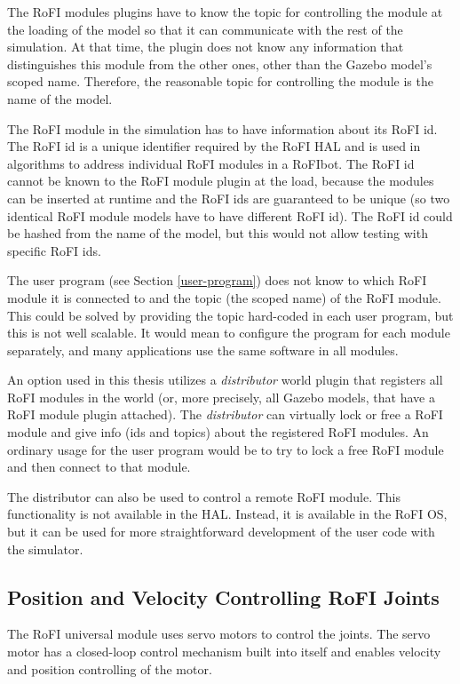 \documentclass[
  printed, %
  color,   %
  notable, %
  oneside, %
  nolof,   %
  nolot,   %
  nocover,
]{fithesis3}
\begin{document}
The RoFI modules plugins have to know the topic for controlling the module at the loading of the model so that it can communicate with the rest of the simulation.
At that time, the plugin does not know any information that distinguishes this module from the other ones, other than the Gazebo model's scoped name.
Therefore, the reasonable topic for controlling the module is the name of the model.

The RoFI module in the simulation has to have information about its RoFI id.
The RoFI id is a unique identifier required by the RoFI HAL and is used in algorithms to address individual RoFI modules in a RoFIbot.
The RoFI id cannot be known to the RoFI module plugin at the load, because the modules can be inserted at runtime and the RoFI ids are guaranteed to be unique (so two identical RoFI module models have to have different RoFI id).
The RoFI id could be hashed from the name of the model, but this would not allow testing with specific RoFI ids.

The user program (see Section \ref{user-program}) does not know to which RoFI module it is connected to and the topic (the scoped name) of the RoFI module.
This could be solved by providing the topic hard-coded in each user program, but this is not well scalable.
It would mean to configure the program for each module separately, and many applications use the same software in all modules.

An option used in this thesis utilizes a \emph{distributor} world plugin that registers all RoFI modules in the world (or, more precisely, all Gazebo models, that have a RoFI module plugin attached).
The \emph{distributor} can virtually lock or free a RoFI module and give info (ids and topics) about the registered RoFI modules.
An ordinary usage for the user program would be to try to lock a free RoFI module and then connect to that module.

The distributor can also be used to control a remote RoFI module.
This functionality is not available in the HAL.
Instead, it is available in the RoFI OS, but it can be used for more straightforward development of the user code with the simulator.

\subsection{Position and Velocity Controlling RoFI Joints}

The RoFI universal module uses servo motors to control the joints.
The servo motor has a closed-loop control mechanism built into itself and enables velocity and position controlling of the motor.
\end{document}
